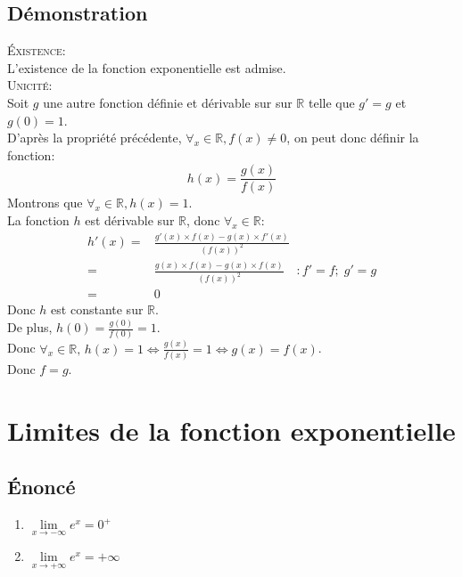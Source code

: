\documentclass[12px]{article}
\begin{document}
	\subsection{Démonstration}
	\textsc{\'Existence:}\\
	L'existence de la fonction exponentielle est admise.\\
	\textsc{Unicité:}\\
	Soit $g$ une autre fonction définie et dérivable sur sur $\mathbb{R}$ telle que $g'=g$ et $g(0)=1$.\\
	D'après la propriété précédente, $\forall_x\in\mathbb{R}, f(x)\not=0$, on peut donc définir la fonction:
	\begin{displaymath}
		h(x)=\frac{g(x)}{f(x)}
	\end{displaymath}
	Montrons que $\forall_x\in\mathbb{R}, h(x)=1$.\\
	La fonction $h$ est dérivable sur $\mathbb{R}$, donc $\forall_x\in\mathbb{R}$:\\
	\begin{align*}
		h'(x)=&\frac{ g'(x)\times f(x) - g(x)\times f'(x) } { (f(x))^2 }\\
			 =&\frac{ g(x)\times f(x) - g(x)\times f(x) } { (f(x))^2 } \quad :f'=f;\; g'=g\\
			 =&0
	\end{align*}
	Donc $h$ est constante sur $\mathbb{R}$.\\
	De plus, $h(0)=\frac{g(0)}{f(0)}=1$.\\
	Donc $\forall_x\in\mathbb{R}, \,h(x)=1 \Leftrightarrow \frac{g(x)}{f(x)}=1 \Leftrightarrow g(x)= f(x)$.\\
	Donc $f=g$.
	
	\section{Limites de la fonction exponentielle}
	
	\subsection{\'Enoncé}
	\begin{enumerate}
		\item $\lim\limits_{x\rightarrow -\infty}e^x = 0^+$
		\item $\lim\limits_{x\rightarrow +\infty}e^x = +\infty$
	\end{enumerate}
	
\end{document}
